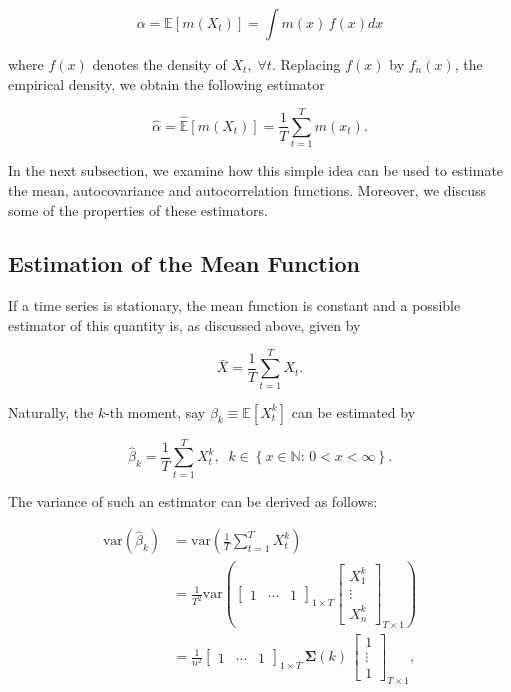 \documentclass[]{book}
\theoremstyle{definition}
\theoremstyle{definition}
\theoremstyle{definition}
\theoremstyle{remark}
\begin{document}
\[\alpha = \mathbb{E}[m(X_t) ] = \int m(x) \, f(x) dx\]

where \(f(x)\) denotes the density of \(X_t, \; \forall t\). Replacing
\(f(x)\) by \(f_n(x)\), the empirical density, we obtain the following
estimator

\[\hat{\alpha} = \widehat{\mathbb{E}}[m(X_t) ] = \frac{1}{T} \sum_{t = 1}^T m\left(x_t\right).\]

In the next subsection, we examine how this simple idea can be used to
estimate the mean, autocovariance and autocorrelation functions.
Moreover, we discuss some of the properties of these estimators.

\subsection{Estimation of the Mean
Function}\label{estimation-of-the-mean-function}

If a time series is stationary, the mean function is constant and a
possible estimator of this quantity is, as discussed above, given by

\[\bar{X} = {\frac{1}{T}\sum\limits_{t = 1}^T {{X_t}} }.\]

Naturally, the \(k\)-th moment, say \(\beta_k \equiv \mathbb{E}[X_t^k]\)
can be estimated by

\[\hat{\beta}_k = {\frac{1}{T}\sum\limits_{t = 1}^T {{X_t^k}} }, \;\; k \in \left\{x \in \mathbb{N} : \, 0 < x < \infty  \right\}.\]

The variance of such an estimator can be derived as follows:

\begin{equation}
  \begin{aligned}
  \text{var} \left( \hat{\beta}_k \right) &= \text{var} \left( {\frac{1}{T}\sum\limits_{t = 1}^T {{X_t^k}} } \right)  \\
  &= \frac{1}{{{T^2}}}\text{var} \left( {{{\left[ {\begin{array}{*{20}{c}}
    1& \cdots &1
    \end{array}} \right]}_{1 \times T}}{{\left[ {\begin{array}{*{20}{c}}
      {{X_1^k}} \\
      \vdots  \\
      {{X_n^k}}
      \end{array}} \right]}_{T \times 1}}} \right)  \\
  &= \frac{1}{{{n^2}}}{\left[ {\begin{array}{*{20}{c}}
    1& \cdots &1
    \end{array}} \right]_{1 \times T}} \, \boldsymbol{\Sigma}(k) \, {\left[ {\begin{array}{*{20}{c}}
      1 \\
      \vdots  \\
      1
      \end{array}} \right]_{T \times 1}}, 
  \end{aligned}
  \label{eq:chap2VarMoment}
\end{equation}
\end{document}

